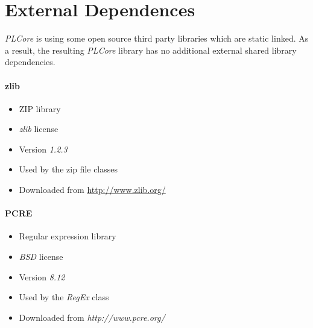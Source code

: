 \section{External Dependences}
\emph{PLCore} is using some open source third party libraries which are static linked. As a result, the resulting \emph{PLCore} library has no additional external shared library dependencies.


\paragraph{zlib}
\begin{itemize}
\item ZIP library
\item \emph{zlib} license
\item Version \emph{1.2.3}
\item Used by the zip file classes
\item Downloaded from \url{http://www.zlib.org/}
\end{itemize}


\paragraph{PCRE}
\begin{itemize}
\item Regular expression library
\item \emph{BSD} license
\item Version \emph{8.12}
\item Used by the \emph{RegEx} class
\item Downloaded from \emph{http://www.pcre.org/}
\end{itemize}





\cleardoublepage

\cleardoublepage

\cleardoublepage

\cleardoublepage

\cleardoublepage

\cleardoublepage

\cleardoublepage

\cleardoublepage

\cleardoublepage
